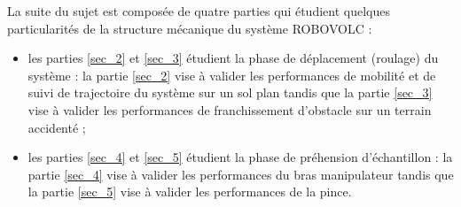 
La suite du sujet est composée de quatre parties qui étudient quelques particularités de la
structure mécanique du système ROBOVOLC :
\begin{itemize}
\item les parties \ref{sec_2} et \ref{sec_3} étudient la phase de déplacement (roulage) du système : la partie \ref{sec_2} vise
à valider les performances de mobilité et de suivi de trajectoire du système sur un sol plan
tandis que la partie \ref{sec_3} vise à valider les performances de franchissement d'obstacle sur un
terrain accidenté ;
\item les parties \ref{sec_4} et \ref{sec_5} étudient la phase de préhension d'échantillon : la partie \ref{sec_4} vise à valider
les performances du bras manipulateur tandis que la partie \ref{sec_5} vise à valider les
performances de la pince.
\end{itemize}


